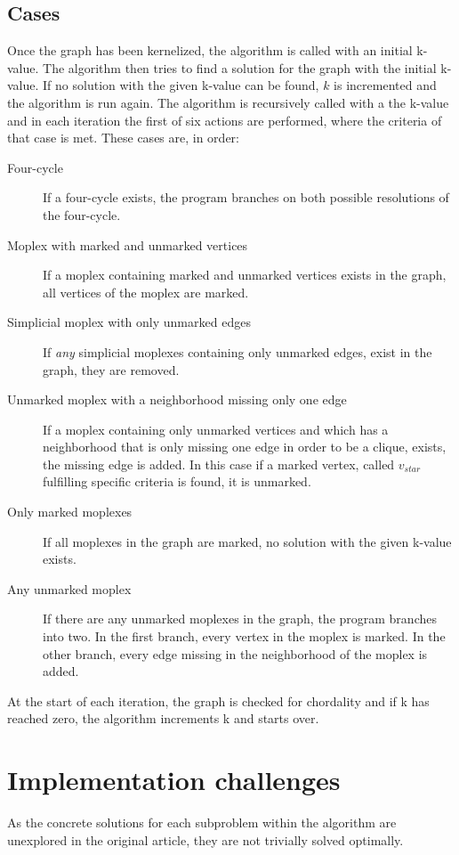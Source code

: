 \documentclass{article}
\begin{document}
		\subsection{Cases} 
		Once the graph has been kernelized, the algorithm is called with an initial k-value. The algorithm then tries to find a solution for the graph with the initial k-value.
		If no solution with the given k-value can be found, $k$ is incremented and the algorithm is run again.
		The algorithm is recursively called with a the k-value and in each iteration the first of six actions are performed, where the criteria of that case is met.
		These cases are, in order:
		\begin{description}
			\item[Four-cycle] If a four-cycle exists, the program branches on both possible resolutions of the four-cycle.
			\item[Moplex with marked and unmarked vertices] If a moplex containing marked and unmarked vertices exists in the graph, all vertices of the moplex are marked.
			\item[Simplicial moplex with only unmarked edges] If \emph{any} simplicial moplexes containing only unmarked edges, exist in the graph, they are removed.
			\item[Unmarked moplex with a neighborhood missing only one edge] If a moplex containing only unmarked vertices and which has a neighborhood that is only missing one edge in order to be a clique, exists, the missing edge is added. In this case if a marked vertex, called $v_{star}$ fulfilling specific criteria is found, it is unmarked.
			\item[Only marked moplexes] If all moplexes in the graph are marked, no solution with the given k-value exists.
			\item[Any unmarked moplex] If there are any unmarked moplexes in the graph, the program branches into two. In the first branch, every vertex in the moplex is marked. In the other branch, every edge missing in the neighborhood of the moplex is added.
		\end{description}

		At the start of each iteration, the graph is checked for chordality and if k has reached zero, the algorithm increments k and starts over.

	\section{Implementation challenges}
	As the concrete solutions for each subproblem within the algorithm are unexplored in the original article, they are not trivially solved optimally.
\end{document}
